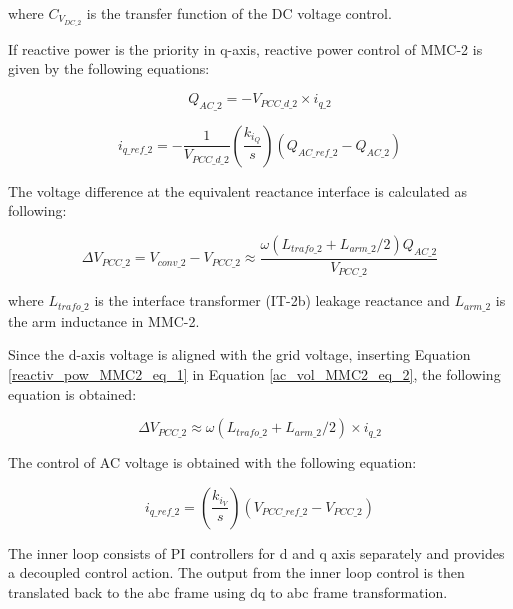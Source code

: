 where $C_{V_{DC\_2}}$ is the transfer function of the \gls{DC} voltage control.

If reactive power is the priority in q-axis, reactive power control of \gls{MMC}-2 is given by the following equations:

\begin{equation}\label{reactiv_pow_MMC2_eq_1}
    Q_{AC\_2} = -V_{PCC\_d\_2} \times i_{q\_2}
\end{equation}

\begin{equation}\label{reactiv_pow_MMC2_eq_2}
    i_{q\_ref\_2} = -  \frac{1}{V_{PCC\_d\_2}} \left(\frac{k_{i_Q}}{s}\right)\left(Q_{AC\_ref\_2}-Q_{AC\_2}\right)
\end{equation}

The voltage difference at the equivalent reactance interface is calculated as following:

\begin{equation}\label{ac_vol_MMC2_eq_2}
    \Delta V_{PCC\_2} = V_{conv\_2} - V_{PCC\_2} \approx \frac{\omega(L_{trafo\_2}+L_{arm\_2}/2)Q_{AC\_2}}{V_{PCC\_2}}
\end{equation}

where $L_{trafo\_2}$ is the interface transformer (IT-2b) leakage reactance and $L_{arm\_2}$ is the arm inductance in \gls{MMC}-2.

Since the d-axis voltage is aligned with the grid voltage, inserting Equation \ref{reactiv_pow_MMC2_eq_1} in Equation \ref{ac_vol_MMC2_eq_2}, the following equation is obtained:

\begin{equation}
   \Delta V_{PCC\_2} \approx \omega(L_{trafo\_2}+L_{arm\_2}/2)\times i_{q\_2}
\end{equation}

The control of \gls{AC} voltage is obtained with the following equation:

\begin{equation}
    i_{q\_ref\_2} =  \left(\frac{k_{i_V}}{s}\right)\left(V_{PCC\_{ref}\_2}-V_{PCC\_2}\right)
\end{equation}

The inner loop consists of \gls{PI} controllers for d and q axis separately and provides a decoupled control action. The output from the inner loop control is then translated back to the abc frame using \gls{dq} to abc frame transformation. 

